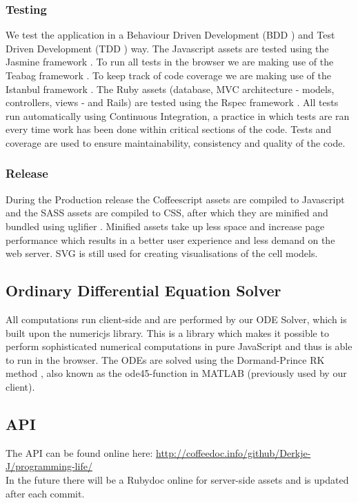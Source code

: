 \documentclass{report}
\begin{document}
			\subsubsection{Testing}
				We test the application in a Behaviour Driven Development (BDD \cite{bdd} ) and Test Driven Development (TDD \cite{tdd} ) way. 
				The Javascript assets are tested using the Jasmine framework \cite{jasmine} . 
				To run all tests in the browser we are making use of the Teabag framework \cite{teabag} . 
				To keep track of code coverage we are making use of the Istanbul framework \cite{istanbul} .
				The Ruby assets (database, MVC architecture - models, controllers, views - and Rails) are tested using the Rspec framework \cite{rspec} .  
				All tests run automatically using Continuous Integration, a practice in which tests are ran every time work has been done within critical sections of the code. 
				Tests and coverage are used to ensure maintainability, consistency and quality of the code.
				
			\subsubsection{Release}
				During the Production release the Coffeescript assets are compiled to Javascript \cite{javascript} and the SASS assets are compiled to CSS, after which they are minified and bundled using uglifier \cite{uglifier} . Minified assets take up less space and increase page performance which results in a better user experience and less demand on the web server. 
				SVG is still used for creating visualisations of the cell models.
		\newpage		
		
		\subsection{Ordinary Differential Equation Solver}
			All computations run client-side and are performed by our ODE Solver, which is built upon the numericjs \cite{numericjs} library. This is a library which makes it possible to perform sophisticated numerical computations in pure JavaScript and thus is able to run in the browser. The ODEs are solved using the Dormand-Prince RK method \cite{dormandprince} , also known as the ode45-function in MATLAB (previously used by our client).
			
		\subsection{API}
			The API can be found online here: \url{http://coffeedoc.info/github/Derkje-J/programming-life/} \\
			In the future there will be a Rubydoc online for server-side assets and is updated after each commit.
		\newpage
			
\end{document}
